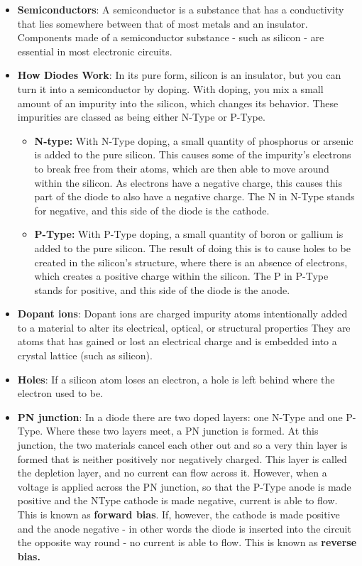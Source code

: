 \documentclass{report}
\begin{document}
\begin{itemize}
        \item \textbf{Semiconductors}: A semiconductor is a substance that has a conductivity that lies somewhere between that of most metals and an insulator. Components made of a semiconductor substance - such as silicon - are essential in most electronic circuits.
        \item \textbf{How Diodes Work}: In its pure form, silicon is an insulator, but you can turn it into a semiconductor by doping. With doping, you mix a small amount of an impurity into the silicon, which changes its behavior. These impurities are classed as being either N-Type or P-Type.
            \begin{itemize}
                \item \textbf{N-type:} With N-Type doping, a small quantity of phosphorus or arsenic is added to the pure silicon. This causes some of the impurity's electrons to break free from their atoms, which are then able to move around within the silicon. As electrons have a negative charge, this causes this part of the diode to also have a negative charge. The N in N-Type stands for negative, and this side of the diode is the cathode.
                \item \textbf{P-Type:} With P-Type doping, a small quantity of boron or gallium is added to the pure silicon. The result of doing this is to cause holes to be created in the silicon's structure, where there is an absence of electrons, which creates a positive charge within the silicon. The P in P-Type stands for positive, and this side of the diode is the anode.
            \end{itemize}
        \item \textbf{Dopant ions}: Dopant ions are charged impurity atoms intentionally added to a material to alter its electrical, optical, or structural properties
            \bigbreak \noindent 
             They are atoms that has gained or lost an electrical charge and is embedded into a crystal lattice (such as silicon).
        \item \textbf{Holes}: If a silicon atom loses an electron, a hole is left behind where the electron used to be.
        \item \textbf{PN junction}: In a diode there are two doped layers: one N-Type and one P-Type. Where these two layers meet, a PN junction is formed. At this junction, the two materials cancel each other out and so a very thin layer is formed that is neither positively nor negatively charged. This layer is called the depletion layer, and no current can flow across it. However, when a voltage is applied across the PN junction, so that the P-Type anode is made positive and the NType cathode is made negative, current is able to flow. This is known as \textbf{forward bias}. If, however, the cathode is made positive and the anode negative - in other words the diode is inserted into the circuit the opposite way round - no current is able to flow. This is known as \textbf{reverse bias.}

\end{itemize}
\end{document}
